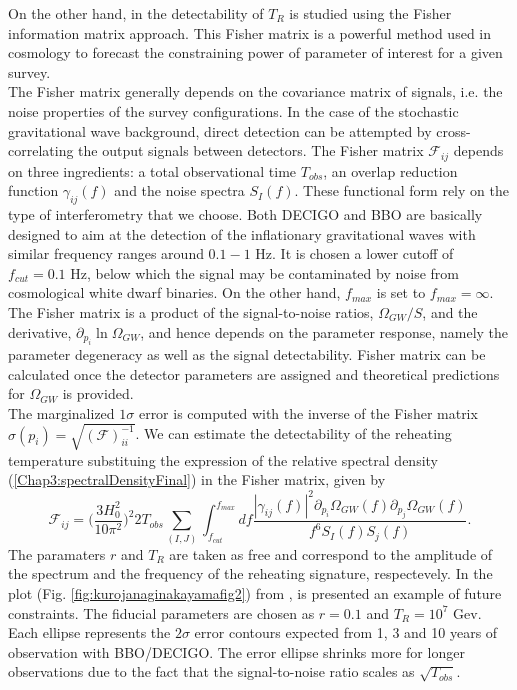 \documentclass[11pt,a4paper,twoside]{book}
\begin{document}
On the other hand, in \cite{Chap3:ProspectsForDeterminationWithDetectors} the detectability of $ T_{R} $ is studied using the Fisher information matrix approach. This Fisher matrix is a powerful method used in cosmology to forecast the constraining power of parameter of interest for a given survey.\\
The Fisher matrix  generally depends on the covariance matrix of signals, i.e. the noise properties of the survey configurations. In the case of the stochastic gravitational wave background, direct detection can be attempted by cross-correlating the output signals between detectors. The Fisher matrix $ \mathcal{F}_{ij} $ depends on three ingredients: a total observational time $ T_{obs} $, an overlap reduction function $ \gamma_{ij}(f) $ and the noise spectra $ S_{I}(f) $. These functional form rely on the type of interferometry that we choose. Both DECIGO and BBO are basically designed to aim at the detection of the inflationary gravitational waves with similar frequency ranges around $ 0.1-1 $ Hz. It is chosen a lower cutoff of $ f_{cut}=0.1  $ Hz, below which the signal may be contaminated by noise from cosmological white dwarf binaries. On the other hand, $ f_{max} $ is set to $ f_{max}=\infty $. \\
The Fisher matrix is a product of the signal-to-noise ratios, $ \Omega_{GW}/S $, and the derivative, $ \partial_{p_{i}} \ln \Omega_{GW} $, and hence depends on the parameter response, namely the parameter degeneracy as well as the signal detectability. Fisher matrix can be calculated once the detector parameters are assigned and theoretical predictions for $\Omega_{GW}$ is provided.\\
The marginalized $ 1\sigma $ error is computed with the inverse of the Fisher matrix 
$ \sigma(p_{i}) = \sqrt{(\mathcal{F})^{-1}_{ii}} $. 
We can estimate the detectability of the reheating temperature substituing the expression of the relative spectral density (\ref{Chap3:spectralDensityFinal}) in the Fisher matrix, given by
\begin{equation}
	\label{FisherMatrix}
	\mathcal{F}_{ij}= \Bigg (\frac{3H_{0}^{2}}{10\pi^{2}}\Bigg)^{2}2T_{obs}\sum_{(I,J)}\int_{f_{cut}}^{f_{max}}
	df\frac{|\gamma_{ij}(f)|^{2} \partial_{p_{i}} \Omega_{GW}(f)\partial_{p_{j}}\Omega_{GW}(f)}{f^{6}S_{I}(f)S_{j}(f)}.
\end{equation}
The paramaters  $ r $ and $ T_{R} $ are taken as free and correspond to the amplitude of the spectrum and the frequency of the reheating signature, respectevely. In the plot (Fig. \ref{fig:kurojanaginakayamafig2}) from \cite{Chap3:ProspectsForDeterminationWithDetectors}, is presented an example of future constraints. The fiducial parameters are chosen as $ r = 0.1 $ and $ T_{R}=10^{7} $ Gev. Each ellipse represents the $ 2\sigma $ error contours expected from 1, 3 and 10 years of observation with 	BBO/DECIGO. The error ellipse shrinks more for longer observations due to the fact that the signal-to-noise ratio scales as $\sqrt{T_{obs}}$. \\
\end{document}
